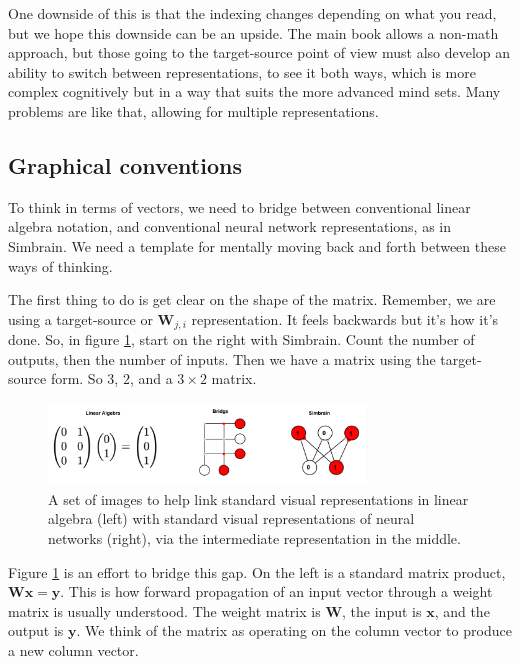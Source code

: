 One downside of this is that the indexing changes depending on what you read, but we hope this downside can be an upside. The main book allows a non-math approach, but those going to the target-source point of view must also develop an ability to switch between representations, to see it both ways, which is more complex cognitively but in a way that suits the more advanced mind sets. Many problems are like that, allowing for multiple representations.


\subsection{Graphical conventions}

To think in terms of vectors, we need to bridge between conventional linear algebra notation, and conventional neural network representations, as in Simbrain. We need a template for mentally moving back and forth between these ways of thinking. 

The first thing to do is get clear on the shape of the matrix. Remember, we are using a target-source or $\textbf{W}_{j,i}$ representation. It feels backwards but it's how it's done. So, in figure \ref{linalgToSimbrain}, start on the right with Simbrain. Count the number of outputs, then the number of inputs. Then we have a matrix using the target-source form. So $3$, $2$, and a $3 \times 2$ matrix.

\begin{figure}[h]
\centering
\includegraphics[width=0.75\textwidth]{images/LinalgToSimbrainReps.png}
\caption[Jeff Yoshimi.]{A set of images to help link standard visual representations in linear algebra (left) with standard visual representations of neural networks (right), via the intermediate representation in the middle. }
\label{linalgToSimbrain}
\end{figure}

Figure \ref{linalgToSimbrain} is an effort to bridge this gap. On the left is a standard matrix product, $\mathbf{W} \mathbf{x} = \mathbf{y}$. This is how forward propagation of an input vector through a weight matrix is usually understood. The weight matrix is $\mathbf{W}$, the input is $\mathbf{x}$, and the output is $\mathbf{y}$. We think of the matrix as operating on the column vector to produce a new column vector.  

